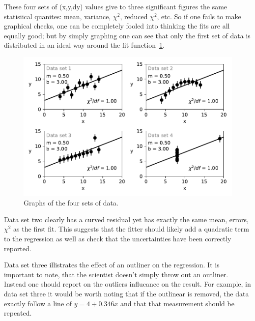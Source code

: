\documentclass[10pt,aps,prc,twocolumn]{revtex4-1}
\begin{document}
\begin{appendix}
These four sets of (x,y,dy) values give to three significant figures the
same statisiical quanites: mean, variance, $\chi^2$, reduced $\chi^2$, etc.
So if one fails to make graphical checks, one can be completely fooled into thinking
the fits are all equally good; but by simply graphing one can see that only the first set 
of data is distributed in an ideal way around the fit function~\ref{SameChi2}.   

\begin{figure}[htb]
\includegraphics[width=\columnwidth]{Figure/SameChi2.pdf}
\caption{Graphs of the four sets of data.}
\label{SameChi2}
\end{figure}


Data set two clearly has a curved residual yet has exactly the 
same mean, errors, $\chi^2$ as the first fit.   This suggests that the fitter 
should likely add a quadratic term to the regression as well as check that
the uncertainties have been correctly reported.

Data set three illistrates the effect of an outliner on the regression.
It is important to note, that the scientist doesn't simply throw out an outliner.
Instead one should report on the outliers influcance on the result.   For example,
in data set three it would be worth noting that if the outlinear is removed, the data
exactly follow a line of $y = 4 + 0.346 x$ and that that measurement should be repeated.


\end{appendix}
\end{document}
